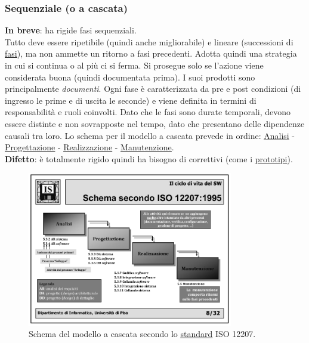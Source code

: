 			\subsubsection{Sequenziale (o a cascata)}  \label{msequenziale}
			\textbf{In breve}: ha rigide fasi sequenziali. \\
			 Tutto deve essere ripetibile (quindi anche migliorabile) e lineare (successioni di \underline{\hyperref[fase]{fasi}}), ma non ammette un ritorno a fasi precedenti. Adotta quindi una strategia in cui si continua o al più ci si ferma. Si prosegue solo se l'azione viene considerata buona (quindi documentata prima). I suoi prodotti sono principalmente \textit{documenti}. Ogni fase è caratterizzata da pre e post condizioni (di ingresso le prime e di uscita le seconde) e viene definita in termini di responsabilità e ruoli coinvolti. Dato che le fasi sono durate temporali, devono essere distinte e non sovrapposte nel tempo, dato che presentano delle dipendenze causali tra loro. Lo schema per il modello a cascata prevede in ordine: \underline{\hyperref[analisideirequisiti]{Analisi}} - \underline{\hyperref[progettazione]{Progettazione}} - \underline{\hyperref[realizzazione]{Realizzazione}} - \underline{\hyperref[manutenzione]{Manutenzione}}.  \\
			 \textbf{Difetto}: è totalmente rigido quindi ha bisogno di correttivi (come i \underline{\hyperref[prototipo]{prototipi}}).

			 \begin{figure}[H]
			 	\centering
			 	\includegraphics[width=0.8\textwidth]{img/cascata}
			 	\caption{Schema del modello a cascata secondo lo \underline{\hyperref[standard]{standard}} ISO 12207.}
			 \end{figure}

